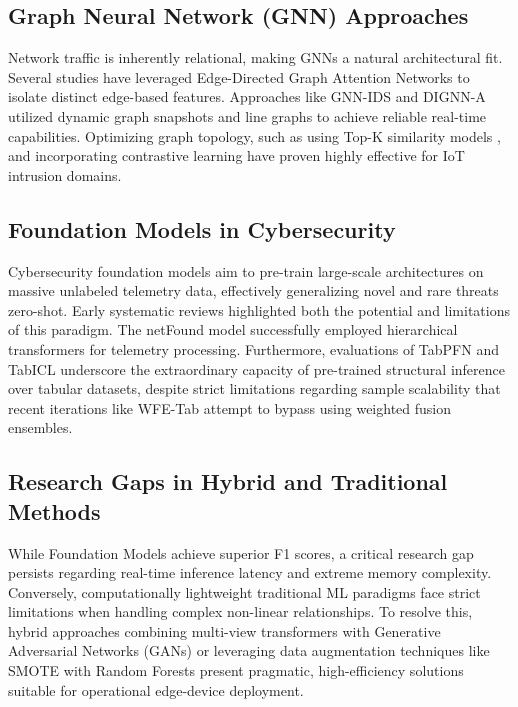 \documentclass[sn-basic,oneside]{sn-jnl}
\theoremstyle{thmstyleone}%
\theoremstyle{thmstyletwo}%
\theoremstyle{thmstylethree}%
\begin{document}
\subsection{Graph Neural Network (GNN) Approaches}
Network traffic is inherently relational, making GNNs a natural architectural fit. Several studies have leveraged Edge-Directed Graph Attention Networks \citep{li2023network} to isolate distinct edge-based features. Approaches like GNN-IDS \citep{sun2024gnn} and DIGNN-A \citep{liu2025dignn} utilized dynamic graph snapshots and line graphs to achieve reliable real-time capabilities. Optimizing graph topology, such as using Top-K similarity models \citep{ngo2025optimizing}, and incorporating contrastive learning \citep{jahin2025cagn} have proven highly effective for IoT intrusion domains.

\subsection{Foundation Models in Cybersecurity}
Cybersecurity foundation models aim to pre-train large-scale architectures on massive unlabeled telemetry data, effectively generalizing novel and rare threats zero-shot. Early systematic reviews \citep{perez2026network} highlighted both the potential and limitations of this paradigm. The netFound model \citep{guthula2025netfound} successfully employed hierarchical transformers for telemetry processing. Furthermore, evaluations of TabPFN and TabICL \citep{garcia2025foundation} underscore the extraordinary capacity of pre-trained structural inference over tabular datasets, despite strict limitations regarding sample scalability that recent iterations like WFE-Tab \citep{ruiz2025wfe} attempt to bypass using weighted fusion ensembles.

\subsection{Research Gaps in Hybrid and Traditional Methods}
While Foundation Models achieve superior F1 scores, a critical research gap persists regarding real-time inference latency and extreme memory complexity. Conversely, computationally lightweight traditional ML paradigms \citep{yuliana2024analysis} face strict limitations when handling complex non-linear relationships. To resolve this, hybrid approaches combining multi-view transformers with Generative Adversarial Networks (GANs) \citep{hasan2026adaptive} or leveraging data augmentation techniques like SMOTE with Random Forests \citep{saputra2025enhancing} present pragmatic, high-efficiency solutions suitable for operational edge-device deployment.
\end{document}

